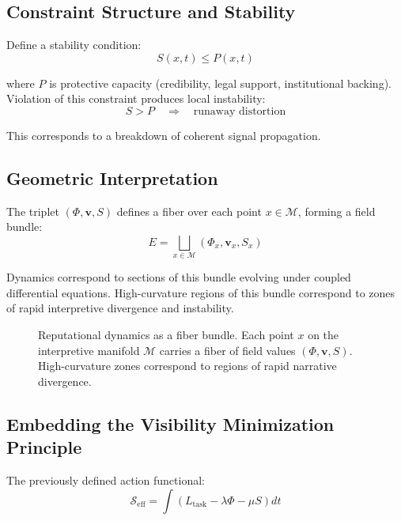 \documentclass[12pt,a4paper]{article}
\begin{document}
\subsection{Constraint Structure and Stability}

Define a stability condition:
\[
S(x,t) \leq P(x,t)
\]

where $P$ is protective capacity (credibility, legal support, institutional backing). Violation of this constraint produces local instability:
\[
S > P \quad \Rightarrow \quad \text{runaway distortion}
\]

This corresponds to a breakdown of coherent signal propagation.

\subsection{Geometric Interpretation}

The triplet $(\Phi, \mathbf{v}, S)$ defines a fiber over each point $x \in \mathcal{M}$, forming a field bundle:
\[
E = \bigsqcup_{x \in \mathcal{M}} (\Phi_x, \mathbf{v}_x, S_x)
\]

Dynamics correspond to sections of this bundle evolving under coupled differential equations. High-curvature regions of this bundle correspond to zones of rapid interpretive divergence and instability.

\begin{figure}[htbp]
\centering
{}
\caption{Reputational dynamics as a fiber bundle. Each point $x$ on the interpretive manifold $\mathcal{M}$ carries a fiber of field values $(\Phi,\mathbf{v},S)$. High-curvature zones correspond to regions of rapid narrative divergence.}
\end{figure}

\subsection{Embedding the Visibility Minimization Principle}

The previously defined action functional:
\[
\mathcal{S}_{\text{eff}} = \int \left( L_{\text{task}} - \lambda \Phi - \mu S \right) dt
\]
\end{document}
